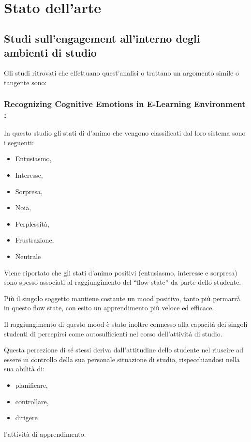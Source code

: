 \chapter{Stato dell'arte}

\section{Studi sull’engagement all’interno degli ambienti di studio}
Gli studi ritrovati che effettuano quest’analisi o trattano un argomento simile o tangente sono:
\subsection{Recognizing Cognitive Emotions in E-Learning Environment \cite{RecoCognEmoELearnEnv}:}
In questo studio gli stati di d’animo che vengono classificati dal loro sistema sono i seguenti:
\begin{itemize}
    \item Entusiasmo,
    \item Interesse,
    \item Sorpresa,
    \item Noia,
    \item Perplessità,
    \item Frustrazione,
    \item Neutrale
\end{itemize}

Viene riportato che gli stati d’animo positivi (entusiasmo, interesse e sorpresa) sono spesso associati al raggiungimento del “flow state” da parte dello studente.

Più il singolo soggetto mantiene costante un mood positivo, tanto più permarrà in questo flow state, con esito un apprendimento più veloce ed efficace.

Il raggiungimento di questo mood è stato inoltre connesso alla capacità dei singoli studenti di percepirsi come autosufficienti nel corso dell’attività di studio.

Questa percezione di sé stessi deriva dall’attitudine dello studente nel riuscire ad essere in controllo della sua personale situazione di studio, rispecchiandosi nella sua abilità di:
\begin{itemize}
    \item pianificare,
    \item controllare,
    \item dirigere
\end{itemize}
l’attività di apprendimento.

